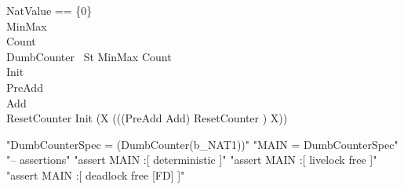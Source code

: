 \begin{circus}
NatValue == \{0\}\\
MinMax \\
Count \\
\circprocess DumbCounter \circdef \circbegin
\circstate\ St  MinMax \land Count\\
Init \\
PreAdd \\
Add \\
ResetCounter 
\circspot Init \circseq (\circmu X \circspot ((\lschexpract (PreAdd \land Add) \lor ResetCounter \rschexpract) \circseq X))
\circend
\end{circus}
\begin{assert}
"DumbCounterSpec = (DumbCounter(b_NAT1))"
\also "MAIN = DumbCounterSpec"
\also "-- assertions"
\also "assert MAIN :[ deterministic ]"
\also "assert MAIN :[ livelock free ]"
\also "assert MAIN :[ deadlock free [FD] ]"
\end{assert}

